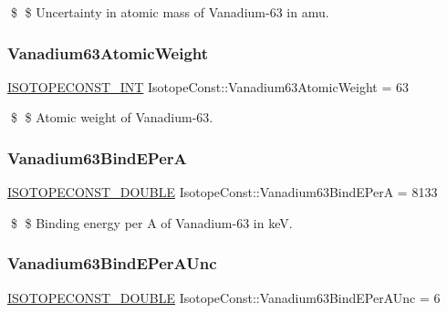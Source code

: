 \$ \$ Uncertainty in atomic mass of Vanadium-\/63 in amu. \mbox{\label{group___isotope_const-_vanadium-_v63_gac0582c5ce47a64e9681251d1d5fa58e6}} 
\subsubsection{\texorpdfstring{Vanadium63\+Atomic\+Weight}{Vanadium63AtomicWeight}}
{\footnotesize\ttfamily \mbox{\hyperlink{group___isotope_const-_macros_ga5f18360b3e99483a35c32d789e62621c}{I\+S\+O\+T\+O\+P\+E\+C\+O\+N\+S\+T\+\_\+\+I\+NT}} Isotope\+Const\+::\+Vanadium63\+Atomic\+Weight = 63}

\$ \$ Atomic weight of Vanadium-\/63. \mbox{\label{group___isotope_const-_vanadium-_v63_gad0aa50184723b0bca93711fcc8029e88}} 
\subsubsection{\texorpdfstring{Vanadium63\+Bind\+E\+PerA}{Vanadium63BindEPerA}}
{\footnotesize\ttfamily \mbox{\hyperlink{group___isotope_const-_macros_ga8f45a7272ce02c0b4c65c44636ed719a}{I\+S\+O\+T\+O\+P\+E\+C\+O\+N\+S\+T\+\_\+\+D\+O\+U\+B\+LE}} Isotope\+Const\+::\+Vanadium63\+Bind\+E\+PerA = 8133}

\$ \$ Binding energy per A of Vanadium-\/63 in keV. \mbox{\label{group___isotope_const-_vanadium-_v63_ga8c1695226b30f30a17eeb3602707c653}} 
\subsubsection{\texorpdfstring{Vanadium63\+Bind\+E\+Per\+A\+Unc}{Vanadium63BindEPerAUnc}}
{\footnotesize\ttfamily \mbox{\hyperlink{group___isotope_const-_macros_ga8f45a7272ce02c0b4c65c44636ed719a}{I\+S\+O\+T\+O\+P\+E\+C\+O\+N\+S\+T\+\_\+\+D\+O\+U\+B\+LE}} Isotope\+Const\+::\+Vanadium63\+Bind\+E\+Per\+A\+Unc = 6}

